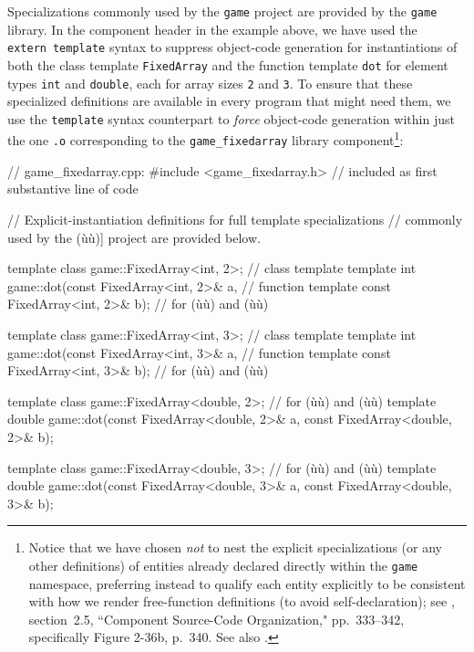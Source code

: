 \noindent Specializations commonly used by the \lstinline!game! project are
provided by the \lstinline!game! library. In the component header in the
example above, we have used the \lstinline!extern!~\lstinline!template! syntax
to suppress object-code generation for instantiations of both the class
template \lstinline!FixedArray! and the function template \lstinline!dot! for
element types \lstinline!int! and \lstinline!double!, each for array sizes
\lstinline!2! and \lstinline!3!. To ensure that these specialized definitions
are available in every program that might need them, we use the
\lstinline!template! syntax counterpart to \emph{force} object-code
generation within just the one \lstinline!.o! corresponding to the
\lstinline!game_fixedarray! library component{\cprotect\footnote{Notice
  that we have chosen \emph{not} to nest the explicit specializations
  (or any other definitions) of entities already declared directly
  within the \lstinline!game! namespace, preferring instead to qualify each
  entity explicitly to be consistent with how we render free-function
  definitions (to avoid self-declaration); see \cite{lakos20}, section~2.5, ``Component Source-Code Organization," pp.~333--342, specifically Figure 2-36b, p.~340. See also .}}:

\begin{emcppslisting}[emcppsbatch=e4]
// game_fixedarray.cpp:
#include <game_fixedarray.h>  // included as first substantive line of code

// Explicit-instantiation definitions for full template specializations
// commonly used by the (ù{}ù)] project are provided below.

template class game::FixedArray<int, 2>;              // class template
template int game::dot(const FixedArray<int, 2>& a,   // function template
                       const FixedArray<int, 2>& b);  // for (ù{}ù) and (ù{}ù)

template class game::FixedArray<int, 3>;              // class template
template int game::dot(const FixedArray<int, 3>& a,   // function template
                       const FixedArray<int, 3>& b);  // for (ù{}ù) and (ù{}ù)

template class game::FixedArray<double, 2>;           // for (ù{}ù) and (ù{}ù)
template double game::dot(const FixedArray<double, 2>& a,
                          const FixedArray<double, 2>& b);

template class game::FixedArray<double, 3>;           // for (ù{}ù) and (ù{}ù)
template double game::dot(const FixedArray<double, 3>& a,
                          const FixedArray<double, 3>& b);
\end{emcppslisting}

